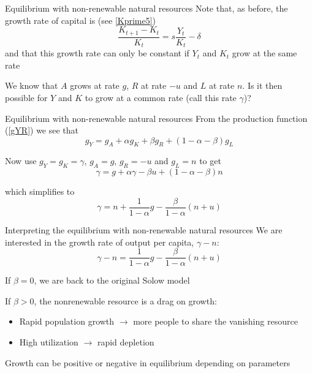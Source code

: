 \documentclass[10pt]{beamer}
\begin{document}
\begin{frame}{Equilibrium with non-renewable natural resources}
    Note that, as before, the growth rate of capital is (see \eqref{Kprime5})
    \begin{equation*}
        \frac{K_{t+1}-K_t}{K_t}=s\frac{Y_t}{K_t}-\delta
    \end{equation*}
    and that this growth rate can only be constant if $Y_t$ and $K_t$ grow at the same rate\medskip

    We know that $A$ grows at rate $g$, $R$ at rate $-u$ and $L$ at rate $n$. Is it then possible for $Y$ and $K$ to grow at a common rate (call this rate $\gamma$)?
\end{frame}


\begin{frame}{Equilibrium with non-renewable natural resources}
    From the production function (\ref{gYR}) we see that
    \[ g_Y = g_A + \alpha g_K + \beta g_R + (1-\alpha-\beta) g_L\]

    Now use $g_Y=g_K=\gamma$, $g_A=g$, $g_R=-u$ and $g_L=n$ to get
    \begin{equation*}
        \gamma = g + \alpha \gamma - \beta u + (1-\alpha-\beta)n
    \end{equation*}

    which simplifies to
    \begin{equation*}
        \gamma = n + \frac{1}{1-\alpha}g - \frac{\beta}{1-\alpha}(n+u) 
    \end{equation*}
\end{frame}


\begin{frame}{Interpreting the equilibrium with non-renewable natural resources}
    We are interested in the growth rate of output per capita, $\gamma-n$:
    \begin{equation*}
        \gamma - n = \frac{1}{1-\alpha}g -\frac{\beta}{1-\alpha}(n+u) 
    \end{equation*}\pause

    If $\beta=0$, we are back to the original Solow model\smallskip
    
    If $\beta>0$, the nonrenewable resource is a drag on growth:
    \begin{itemize}
        \item Rapid population growth $\rightarrow$ more people to share the vanishing resource
        \item High utilization $\rightarrow$ rapid depletion
    \end{itemize}\smallskip
    \pause

    Growth can be positive or negative in equilibrium depending on parameters
\end{frame}
\end{document}
